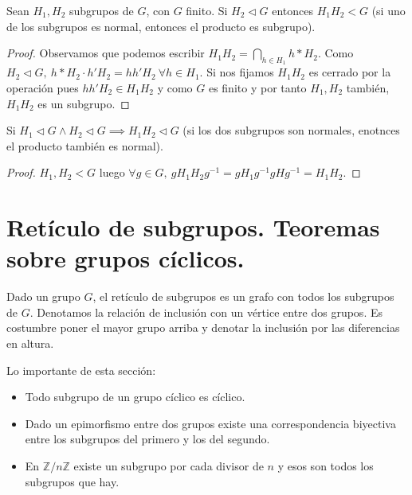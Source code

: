 \documentclass{book}
\theoremstyle{definition}
\theoremstyle{remark}
\newcommand{\normsub}{\mathbin{\triangleleft}}
\newcommand{\ZnZ}{\mathbb{Z}/n\mathbb{Z}}
\begin{document}
\begin{thm}
	Sean $H_1, H_2$ subgrupos de $G$, con $G$ finito. Si $H_2 \normsub G$ entonces $H_1 H_2 < G$ (si uno de los subgrupos es normal, entonces el producto es subgrupo).
\end{thm}

\begin{proof}
	Observamos que podemos escribir $H_1H_2 = \bigcap_{h \in H_1} h \ast H_2$. Como $H_2 \normsub G,\ h\ast H_2 \cdot h' H_2 = h h' H_2\ \forall h \in H_1$. Si nos fijamos $H_1 H_2$ es cerrado por la operación pues $h h' H_2 \in H_1H_2$ y como $G$ es finito y por tanto $H_1, H_2$ también, $H_1H_2$ es un subgrupo.	
\end{proof}

\begin{thm}
	Si $H_1 \normsub G \land H_2 \normsub G \implies H_1 H_2 \normsub G$ (si los dos subgrupos son normales, enotnces el producto también es normal).
\end{thm}

\begin{proof}
	$H_1,H_2 < G$ luego $\forall g \in G,\ gH_1H_2g^{-1} = gH_1g^{-1}gHg^{-1}  = H_1 H_2 $.
\end{proof}


\section{Retículo de subgrupos. Teoremas sobre grupos cíclicos.}

\begin{dfn}
	Dado un grupo $G$, el retículo de subgrupos es un grafo con todos los subgrupos de $G$. Denotamos la relación de inclusión con un vértice entre dos grupos. Es costumbre poner el mayor grupo arriba y denotar la inclusión por las diferencias en altura.
\end{dfn}

Lo importante de esta sección:
\begin{itemize}
	\item Todo subgrupo de un grupo cíclico es cíclico.
	\item Dado un epimorfismo entre dos grupos existe una correspondencia biyectiva entre los subgrupos del primero y los del segundo.
	\item En $\ZnZ$ existe un subgrupo por cada divisor de $n$ y esos son todos los subgrupos que hay.
\end{itemize}
\end{document}
